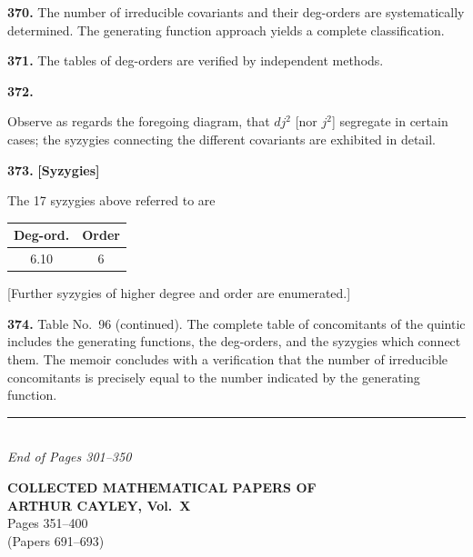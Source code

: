 \documentclass[11pt,a4paper]{book}
\begin{document}
\medskip
\noindent\textbf{370.}\quad
The number of irreducible covariants and their deg-orders are systematically determined. The generating function approach yields a complete classification.

\medskip
\noindent\textbf{371.}\quad
The tables of deg-orders are verified by independent methods.

\medskip
\noindent\textbf{372.}

Observe as regards the foregoing diagram, that $dj^2$ [nor $j^2$] segregate in certain cases; the syzygies connecting the different covariants are exhibited in detail.

\medskip
\noindent\textbf{373.}\quad
\textbf{[Syzygies]}

The 17 syzygies above referred to are

\begin{center}
\begin{tabular}{|c|c|}
\hline
Deg-ord. & Order \\
\hline
6.10 & 6 \\
\hline
\end{tabular}
\end{center}

[Further syzygies of higher degree and order are enumerated.]

\medskip
\noindent\textbf{374.}\quad
Table No.\ 96 (continued). The complete table of concomitants of the quintic includes the generating functions, the deg-orders, and the syzygies which connect them. The memoir concludes with a verification that the number of irreducible concomitants is precisely equal to the number indicated by the generating function.

\vspace{2em}
\begin{center}
\rule{0.5\textwidth}{0.4pt}\\[1em]
\textit{End of Pages 301--350}
\end{center}
\clearpage


\thispagestyle{empty}
\begin{center}
{\LARGE\bfseries COLLECTED MATHEMATICAL PAPERS OF}\\[6pt]
{\LARGE\bfseries ARTHUR CAYLEY, Vol.\ X}\\[12pt]
{\large Pages 351--400}\\[6pt]
{\small (Papers 691--693)}
\end{center}
\end{document}
